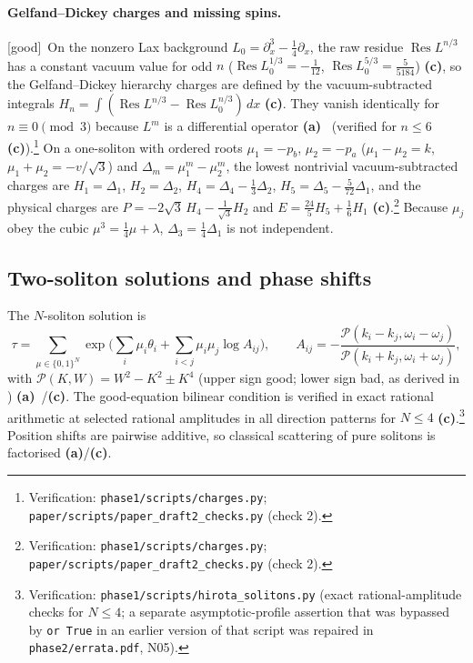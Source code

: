 \documentclass[11pt,a4paper]{article}
\newcommand{\lab}[1]{{\normalfont\sffamily\footnotesize\bfseries(#1)}}
\newcommand{\La}{\lab{a}}
\newcommand{\Lc}{\lab{c}}
\newcommand{\eqtag}[2]{{\normalfont\sffamily\footnotesize\textcolor{#1}{[#2]}}}
\newcommand{\Good}{\eqtag{teal!70!black}{good}}
\newcommand{\scr}[1]{\nolinkurl{#1}}
\newcommand{\chk}[1]{\footnote{\raggedright Verification: #1.}}
\newcommand{\Res}{\operatorname{Res}}
\theoremstyle{remark}
\begin{document}
\paragraph{Gelfand--Dickey charges and missing spins.} \Good\ On the nonzero Lax background $L_0=\partial_x^3-\tfrac14\partial_x$, the raw residue $\Res L^{n/3}$ has a constant vacuum value for odd $n$ ($\Res L_0^{1/3}=-\tfrac1{12}$, $\Res L_0^{5/3}=\tfrac5{5184}$) \Lc, so the Gelfand--Dickey hierarchy charges are defined by the vacuum-subtracted integrals $H_n=\int(\Res L^{n/3}-\Res L_0^{n/3})\,dx$ \Lc. They vanish identically for $n\equiv0\pmod3$ because $L^m$ is a differential operator \La~\cite{Dickey} (verified for $n\le6$ \Lc).\chk{\scr{phase1/scripts/charges.py}; \scr{paper/scripts/paper_draft2_checks.py} (check 2)} On a one-soliton with ordered roots $\mu_1=-p_b$, $\mu_2=-p_a$ ($\mu_1-\mu_2=k$, $\mu_1+\mu_2=-v/\sqrt3$) and $\Delta_m=\mu_1^m-\mu_2^m$, the lowest nontrivial vacuum-subtracted charges are $H_1=\Delta_1$, $H_2=\Delta_2$, $H_4=\Delta_4-\tfrac13\Delta_2$, $H_5=\Delta_5-\tfrac5{72}\Delta_1$, and the physical charges are $P=-2\sqrt3\,H_4-\tfrac1{\sqrt3}H_2$ and $E=\tfrac{24}5H_5+\tfrac16H_1$ \Lc.\chk{\scr{phase1/scripts/charges.py}; \scr{paper/scripts/paper_draft2_checks.py} (check 2)} Because $\mu_j$ obey the cubic $\mu^3=\tfrac14\mu+\lambda$, $\Delta_3=\tfrac14\Delta_1$ is not independent.

\subsection{Two-soliton solutions and phase shifts}\label{sec:twosol}

The $N$-soliton solution is
\begin{equation}\label{eq:Nsol}
\tau=\sum_{\mu\in\{0,1\}^N}\exp\Big(\sum_i\mu_i\theta_i+\sum_{i<j}\mu_i\mu_j\log A_{ij}\Big),\qquad
A_{ij}=-\frac{\mathcal P(k_i-k_j,\omega_i-\omega_j)}{\mathcal P(k_i+k_j,\omega_i+\omega_j)},
\end{equation}
with $\mathcal P(K,W)=W^2-K^2\pm K^4$ (upper sign good; lower sign bad, as derived in \cite{Hirota73}) \La~\cite{Hirota73}/\Lc. The good-equation bilinear condition is verified in exact rational arithmetic at selected rational amplitudes in all direction patterns for $N\le4$ \Lc.\chk{\scr{phase1/scripts/hirota_solitons.py} (exact rational-amplitude checks for $N\le4$; a separate asymptotic-profile assertion that was bypassed by \texttt{or True} in an earlier version of that script was repaired in \scr{phase2/errata.pdf}, N05)} Position shifts are pairwise additive, so classical scattering of pure solitons is factorised \La/\Lc.
\end{document}
